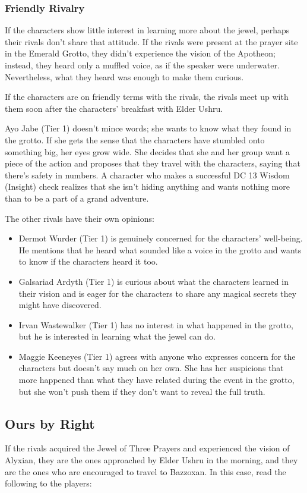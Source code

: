 \documentclass[10pt,a4paper,twoside,twocolumn,openany,nodeprecatedcode]{dndbook}
\begin{document}
\subsubsection{Friendly Rivalry}
If the characters show little interest in learning more about the jewel, perhaps their rivals don't share that attitude. If the rivals were present at the prayer site in the Emerald Grotto, they didn't experience the vision of the Apotheon; instead, they heard only a muffled voice, as if the speaker were underwater. Nevertheless, what they heard was enough to make them curious.

If the characters are on friendly terms with the rivals, the rivals meet up with them soon after the characters' breakfast with Elder Ushru.

Ayo Jabe (Tier 1) doesn't mince words; she wants to know what they found in the grotto. If she gets the sense that the characters have stumbled onto something big, her eyes grow wide. She decides that she and her group want a piece of the action and proposes that they travel with the characters, saying that there's safety in numbers. A character who makes a successful DC 13 Wisdom (Insight) check realizes that she isn't hiding anything and wants nothing more than to be a part of a grand adventure.

The other rivals have their own opinions:


\begin{itemize}
\item Dermot Wurder (Tier 1) is genuinely concerned for the characters' well-being. He mentions that he heard what sounded like a voice in the grotto and wants to know if the characters heard it too.
\item Galsariad Ardyth (Tier 1) is curious about what the characters learned in their vision and is eager for the characters to share any magical secrets they might have discovered.
\item Irvan Wastewalker (Tier 1) has no interest in what happened in the grotto, but he is interested in learning what the jewel can do.
\item Maggie Keeneyes (Tier 1) agrees with anyone who expresses concern for the characters but doesn't say much on her own. She has her suspicions that more happened than what they have related during the event in the grotto, but she won't push them if they don't want to reveal the full truth.
\end{itemize}

\subsection{Ours by Right}
If the rivals acquired the Jewel of Three Prayers and experienced the vision of Alyxian, they are the ones approached by Elder Ushru in the morning, and they are the ones who are encouraged to travel to Bazzoxan. In this case, read the following to the players:
\end{document}

